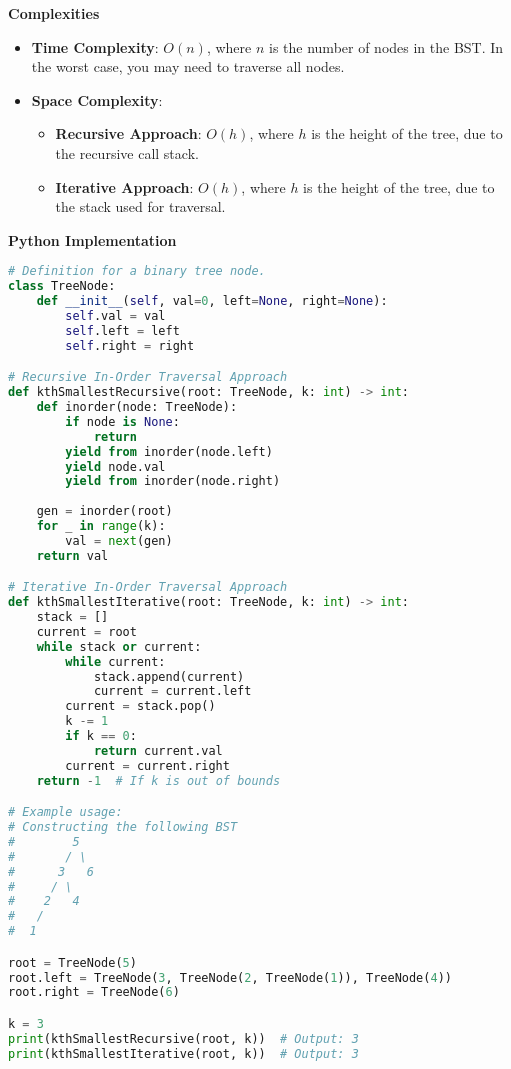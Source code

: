 \textbf{Complexities}

\begin{itemize}
    \item \textbf{Time Complexity}: \(O(n)\), where \(n\) is the number of nodes in the BST. In the worst case, you may need to traverse all nodes.
    \item \textbf{Space Complexity}: 
    \begin{itemize}
        \item \textbf{Recursive Approach}: \(O(h)\), where \(h\) is the height of the tree, due to the recursive call stack.
        \item \textbf{Iterative Approach}: \(O(h)\), where \(h\) is the height of the tree, due to the stack used for traversal.
    \end{itemize}
\end{itemize}

\textbf{Python Implementation}

\begin{lstlisting}[language=Python, xleftmargin=0.02\textwidth, xrightmargin=0.02\textwidth]
# Definition for a binary tree node.
class TreeNode:
    def __init__(self, val=0, left=None, right=None):
        self.val = val
        self.left = left
        self.right = right

# Recursive In-Order Traversal Approach
def kthSmallestRecursive(root: TreeNode, k: int) -> int:
    def inorder(node: TreeNode):
        if node is None:
            return
        yield from inorder(node.left)
        yield node.val
        yield from inorder(node.right)
    
    gen = inorder(root)
    for _ in range(k):
        val = next(gen)
    return val

# Iterative In-Order Traversal Approach
def kthSmallestIterative(root: TreeNode, k: int) -> int:
    stack = []
    current = root
    while stack or current:
        while current:
            stack.append(current)
            current = current.left
        current = stack.pop()
        k -= 1
        if k == 0:
            return current.val
        current = current.right
    return -1  # If k is out of bounds

# Example usage:
# Constructing the following BST
#        5
#       / \
#      3   6
#     / \
#    2   4
#   /
#  1

root = TreeNode(5)
root.left = TreeNode(3, TreeNode(2, TreeNode(1)), TreeNode(4))
root.right = TreeNode(6)

k = 3
print(kthSmallestRecursive(root, k))  # Output: 3
print(kthSmallestIterative(root, k))  # Output: 3
\end{lstlisting}


